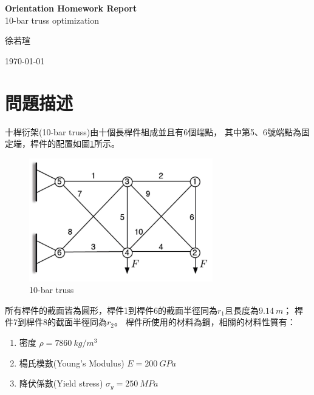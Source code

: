 \documentclass[12pt,a4paper]{article}
\begin{document}
\begin{center}
    
    \vspace*{5cm}
    \textbf{\huge Orientation Homework Report}\\   %
    
    \vspace{1cm}
    {\large 10-bar truss optimization}
    
    \vfill
    {\Large 徐若瑄}
    
    \vspace{1cm}
    {\Large \today}

\end{center}
\newpage




\section{問題描述}

    十桿衍架(10-bar truss)由十個長桿件組成並且有6個端點，
    其中第5、6號端點為固定端，桿件的配置如圖\ref{10-bar truss}所示。
    
    \begin{figure}[h]
        \centering
        \includegraphics[width=8cm]{10_bar_truss}
        \caption{10-bar truss}
        \label{10-bar truss}
    \end{figure}
    
    所有桿件的截面皆為圓形，桿件1到桿件6的截面半徑同為$r_1$且長度為$9.14\ m$；
    桿件7到桿件8的截面半徑同為$r_2$。
    桿件所使用的材料為鋼，相關的材料性質有：
    
    \begin{enumerate}
        \item 密度 $\rho = 7860\ kg/m^3$
        \item 楊氏模數(Young's Modulus) $E = 200\ GPa$
        \item 降伏係數(Yield stress) $\sigma_y = 250\ MPa$
    \end{enumerate}
    
\end{document}
